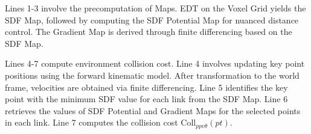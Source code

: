 \documentclass{article}
\begin{document}
Lines 1-3 involve the precomputation of Maps. 
EDT on the Voxel Grid yields the SDF Map, followed by computing the SDF Potential Map for nuanced distance control. The Gradient Map is derived through finite differencing based on the SDF Map.

Lines 4-7 compute environment collision cost.
Line 4 involves updating key point positions using the forward kinematic model. After transformation to the world frame, velocities are obtained via finite differencing. Line 5 identifies the key point with the minimum SDF value for each link from the SDF Map. Line 6 retrieves the values of  SDF Potential and Gradient Maps for the selected points in each link. Line 7 computes the collision cost \(\text{Coll}_{ppv\theta}(pt)\).
\end{document}
